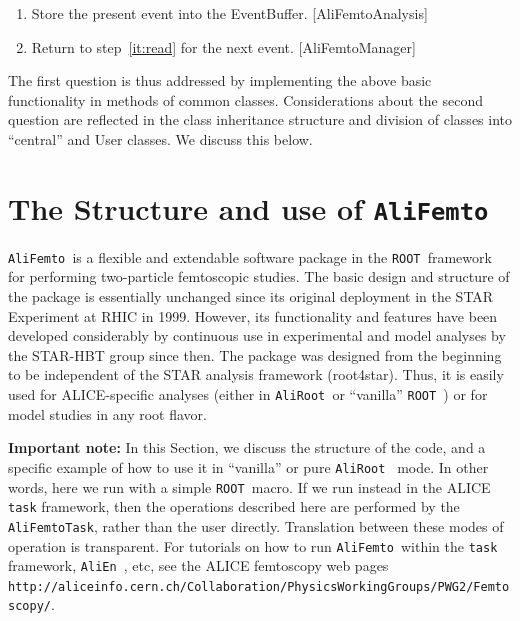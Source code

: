 \documentclass[twoside]{article}
\newcommand{\name}[1]{\textsf{#1}}%
\newcommand{\AliEn}{{\tt AliEn }}
\newcommand{\AliFemto}{{\tt AliFemto }}
\newcommand{\AliRoot}{{\tt AliRoot }}
\newcommand{\ROOT}{{\tt ROOT }}
\begin{document}
\begin{enumerate}
                      {\it Usually}, but not neccessarily, this involves calculation of some relative
                      variable (usually the same one as in step~\ref{it:Num}) and incrementing a histogram.
\item\label{it:Store} Store the present event into the EventBuffer.                                  [\name{AliFemtoAnalysis}]
\item\label{it:loop}  Return to step~\ref{it:read} for the next event.                               [\name{AliFemtoManager}]
\end{enumerate}

The first question is thus addressed by implementing the above basic functionality in methods of common classes.
Considerations about the second question are reflected in the class inheritance structure and division of classes
into ``central'' and User classes.  We discuss this below.

\section{The Structure and use of \AliFemto}
\label{sec:AliFemtoDiagramEtc}

\AliFemto is a flexible and extendable software package in the \ROOT framework for performing two-particle
femtoscopic studies.  The basic design and structure of the package is essentially unchanged since its
original deployment in the STAR Experiment at RHIC in 1999.  However, its functionality and features
have been developed considerably by continuous use in experimental and model analyses by the STAR-HBT
group since then.  The  package was designed from the beginning to be independent of the STAR analysis framework
(root4star).  Thus, it is easily used for ALICE-specific analyses (either in \AliRoot or ``vanilla'' \ROOT)
or for model studies in any root flavor.

{\bf Important note:}
In this Section, we discuss the structure of the code, and a specific example of how to use it in ``vanilla'' or pure \AliRoot
mode.  In other words, here we run with a simple \ROOT macro.  If we run instead in the ALICE {\tt task} framework, then the
operations described here are performed by the {\tt AliFemtoTask}, rather than the user directly.  Translation between these
modes of operation is transparent.  For tutorials on how to run \AliFemto within the {\tt task} framework, \AliEn, etc, see
the ALICE femtoscopy web pages\\
 {\tt http://aliceinfo.cern.ch/Collaboration/PhysicsWorkingGroups/PWG2/Femtoscopy/}.
\end{document}
